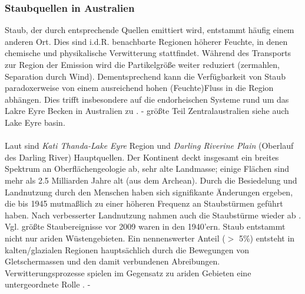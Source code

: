 \documentclass[12pt,a4paper,onecolumn]{scrartcl}
\begin{document}
\subsubsection{Staubquellen in Australien} \label{sec:staubquellen}
Staub, der durch entsprechende Quellen emittiert wird, entstammt häufig einem anderen Ort. Dies sind i.d.R. benachbarte Regionen höherer Feuchte, in denen chemische und physikalische Verwitterung stattfindet. Während des Transports zur Region der Emission wird die Partikelgröße weiter reduziert (zermahlen, Separation durch Wind). Dementsprechend kann die Verfügbarkeit von Staub paradoxerweise von einem ausreichend hohen (Feuchte)Fluss in die Region abhängen. Dies trifft insbesondere auf die endorheischen Systeme rund um das Lakre Eyre Becken in Australien zu \citep{Marx.2018}. - größte Teil Zentralaustralien \citep{Shao.2011} siehe auch Lake Eyre basin. \\\\
Laut \citet{Deckker.2019} sind \textit{Kati Thanda-Lake Eyre} Region und \textit{Darling Riverine Plain} (Oberlauf des Darling River) Hauptquellen. Der Kontinent deckt insgesamt ein breites Spektrum an Oberflächengeologie ab, sehr alte Landmasse; einige Flächen sind mehr als 2.5 Milliarden Jahre alt (aus dem Archean). Durch die Besiedelung und Landnutzung durch den Menschen haben sich signifikante Änderungen ergeben, die bis 1945 mutmaßlich zu einer höheren Frequenz an Staubstürmen geführt haben. Nach verbesserter Landnutzung nahmen auch die Staubstürme wieder ab \citep{Deckker.2019}. Vgl. größte Staubereignisse vor 2009 waren in den 1940'ern. Staub entstammt nicht nur ariden Wüstengebieten. Ein nennenswerter Anteil ($>$ 5\%) entsteht in kalten/glazialen Regionen hauptsächlich durch die Bewegungen von Gletschermassen und den damit verbundenen Abreibungen. Verwitterungsprozesse spielen im Gegensatz zu ariden Gebieten eine untergeordnete Rolle \citep{Marx.2018}. -
\end{document}
